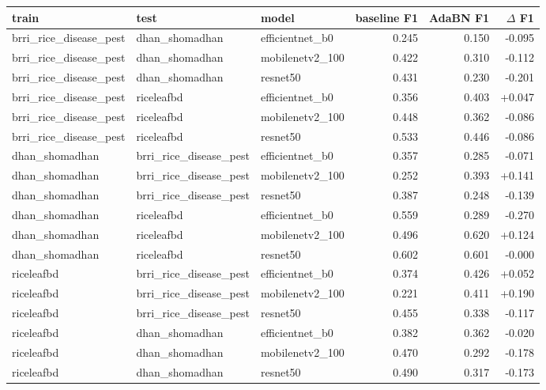 \begin{tabular}{lllrrr}
\toprule
train & test & model & baseline F1 & AdaBN F1 & $\Delta$ F1 \\
\midrule
brri\_rice\_disease\_pest & dhan\_shomadhan & efficientnet\_b0 & 0.245 & 0.150 & -0.095 \\
brri\_rice\_disease\_pest & dhan\_shomadhan & mobilenetv2\_100 & 0.422 & 0.310 & -0.112 \\
brri\_rice\_disease\_pest & dhan\_shomadhan & resnet50 & 0.431 & 0.230 & -0.201 \\
brri\_rice\_disease\_pest & riceleafbd & efficientnet\_b0 & 0.356 & 0.403 & +0.047 \\
brri\_rice\_disease\_pest & riceleafbd & mobilenetv2\_100 & 0.448 & 0.362 & -0.086 \\
brri\_rice\_disease\_pest & riceleafbd & resnet50 & 0.533 & 0.446 & -0.086 \\
dhan\_shomadhan & brri\_rice\_disease\_pest & efficientnet\_b0 & 0.357 & 0.285 & -0.071 \\
dhan\_shomadhan & brri\_rice\_disease\_pest & mobilenetv2\_100 & 0.252 & 0.393 & +0.141 \\
dhan\_shomadhan & brri\_rice\_disease\_pest & resnet50 & 0.387 & 0.248 & -0.139 \\
dhan\_shomadhan & riceleafbd & efficientnet\_b0 & 0.559 & 0.289 & -0.270 \\
dhan\_shomadhan & riceleafbd & mobilenetv2\_100 & 0.496 & 0.620 & +0.124 \\
dhan\_shomadhan & riceleafbd & resnet50 & 0.602 & 0.601 & -0.000 \\
riceleafbd & brri\_rice\_disease\_pest & efficientnet\_b0 & 0.374 & 0.426 & +0.052 \\
riceleafbd & brri\_rice\_disease\_pest & mobilenetv2\_100 & 0.221 & 0.411 & +0.190 \\
riceleafbd & brri\_rice\_disease\_pest & resnet50 & 0.455 & 0.338 & -0.117 \\
riceleafbd & dhan\_shomadhan & efficientnet\_b0 & 0.382 & 0.362 & -0.020 \\
riceleafbd & dhan\_shomadhan & mobilenetv2\_100 & 0.470 & 0.292 & -0.178 \\
riceleafbd & dhan\_shomadhan & resnet50 & 0.490 & 0.317 & -0.173 \\
\bottomrule
\end{tabular}
